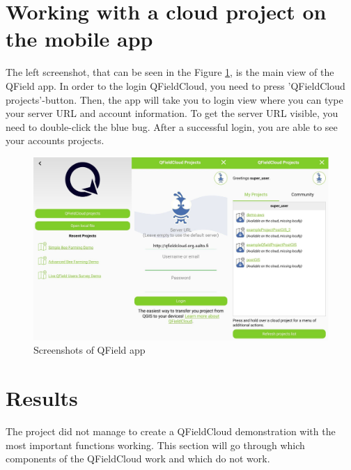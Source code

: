 \documentclass{article}
\begin{document}





\section{Working with a cloud project on the mobile app}
The left screenshot, that can be seen in the Figure \ref{fig:login-qfield}, is the main view of the QField app. In order to the login QFieldCloud, you need to press 'QFieldCloud projects'-button. Then, the app will take you to login view where you can type your server URL and account information. To get the server URL visible, you need to double-click the blue bug. After a successful login, you are able to see your accounts projects.

\begin{figure}[H]
    \centering
    \includegraphics[width=1\textwidth]{qfield-login.png}
    \caption{Screenshots of QField app}
    \label{fig:login-qfield}
\end{figure}


\section{Results}
The project did not manage to create a QFieldCloud demonstration with the most important functions working. This section will go through which components of the QFieldCloud work and which do not work. 
\end{document}
